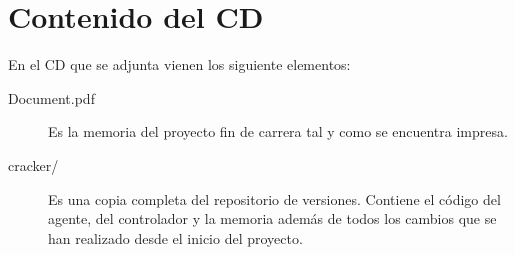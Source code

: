 \chapter{Contenido del CD}

En el CD que se adjunta vienen los siguiente elementos:

\begin{description}
	\item[Document.pdf] Es la memoria del proyecto fin de carrera tal y como se encuentra impresa.
	
	\item[cracker/] Es una copia completa del repositorio de versiones. Contiene el código del agente, del controlador y la memoria además de todos los cambios que se han realizado desde el inicio del proyecto.
\end{description}